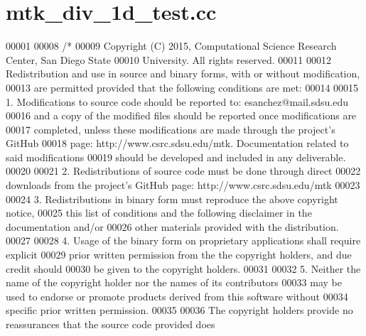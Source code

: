 \hypertarget{mtk__div__1d__test_8cc_source}{\section{mtk\+\_\+div\+\_\+1d\+\_\+test.\+cc}
\label{mtk__div__1d__test_8cc_source}
}

\begin{DoxyCode}
00001 
00008 \textcolor{comment}{/*}
00009 \textcolor{comment}{Copyright (C) 2015, Computational Science Research Center, San Diego State}
00010 \textcolor{comment}{University. All rights reserved.}
00011 \textcolor{comment}{}
00012 \textcolor{comment}{Redistribution and use in source and binary forms, with or without modification,}
00013 \textcolor{comment}{are permitted provided that the following conditions are met:}
00014 \textcolor{comment}{}
00015 \textcolor{comment}{1. Modifications to source code should be reported to: esanchez@mail.sdsu.edu}
00016 \textcolor{comment}{and a copy of the modified files should be reported once modifications are}
00017 \textcolor{comment}{completed, unless these modifications are made through the project's GitHub}
00018 \textcolor{comment}{page: http://www.csrc.sdsu.edu/mtk. Documentation related to said modifications}
00019 \textcolor{comment}{should be developed and included in any deliverable.}
00020 \textcolor{comment}{}
00021 \textcolor{comment}{2. Redistributions of source code must be done through direct}
00022 \textcolor{comment}{downloads from the project's GitHub page: http://www.csrc.sdsu.edu/mtk}
00023 \textcolor{comment}{}
00024 \textcolor{comment}{3. Redistributions in binary form must reproduce the above copyright notice,}
00025 \textcolor{comment}{this list of conditions and the following disclaimer in the documentation and/or}
00026 \textcolor{comment}{other materials provided with the distribution.}
00027 \textcolor{comment}{}
00028 \textcolor{comment}{4. Usage of the binary form on proprietary applications shall require explicit}
00029 \textcolor{comment}{prior written permission from the the copyright holders, and due credit should}
00030 \textcolor{comment}{be given to the copyright holders.}
00031 \textcolor{comment}{}
00032 \textcolor{comment}{5. Neither the name of the copyright holder nor the names of its contributors}
00033 \textcolor{comment}{may be used to endorse or promote products derived from this software without}
00034 \textcolor{comment}{specific prior written permission.}
00035 \textcolor{comment}{}
00036 \textcolor{comment}{The copyright holders provide no reassurances that the source code provided does}

\end{DoxyCode}
